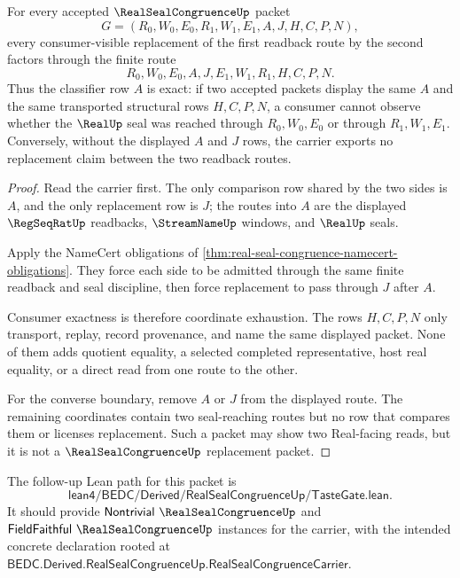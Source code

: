 \begin{theorem}
\label{thm:real-seal-congruence-classifier-exactness}
For every accepted $\RealSealCongruenceUp$ packet
$$
G=(R_0,W_0,E_0,R_1,W_1,E_1,A,J,H,C,P,N),
$$
every consumer-visible replacement of the first readback route by the second factors through the finite route
$$
R_0,W_0,E_0,A,J,E_1,W_1,R_1,H,C,P,N.
$$
Thus the classifier row $A$ is exact: if two accepted packets display the same $A$ and the same transported structural rows $H,C,P,N$, a consumer cannot observe whether the $\RealUp$ seal was reached through $R_0,W_0,E_0$ or through $R_1,W_1,E_1$. Conversely, without the displayed $A$ and $J$ rows, the carrier exports no replacement claim between the two readback routes.
\end{theorem}
\begin{proof}
Read the carrier first. The only comparison row shared by the two sides is $A$, and the only replacement row is $J$; the routes into $A$ are the displayed $\RegSeqRatUp$ readbacks, $\StreamNameUp$ windows, and $\RealUp$ seals.

Apply the NameCert obligations of \autoref{thm:real-seal-congruence-namecert-obligations}. They force each side to be admitted through the same finite readback and seal discipline, then force replacement to pass through $J$ after $A$.

Consumer exactness is therefore coordinate exhaustion. The rows $H,C,P,N$ only transport, replay, record provenance, and name the same displayed packet. None of them adds quotient equality, a selected completed representative, host real equality, or a direct read from one route to the other.

For the converse boundary, remove $A$ or $J$ from the displayed route. The remaining coordinates contain two seal-reaching routes but no row that compares them or licenses replacement. Such a packet may show two Real-facing reads, but it is not a $\RealSealCongruenceUp$ replacement packet.
\end{proof}

The follow-up Lean path for this packet is
$$
\mathsf{lean4/BEDC/Derived/RealSealCongruenceUp/TasteGate.lean}.
$$
It should provide $\mathsf{Nontrivial}\ \RealSealCongruenceUp$ and $\mathsf{FieldFaithful}\ \RealSealCongruenceUp$ instances for the carrier, with the intended concrete declaration rooted at $\mathsf{BEDC.Derived.RealSealCongruenceUp.RealSealCongruenceCarrier}$.


